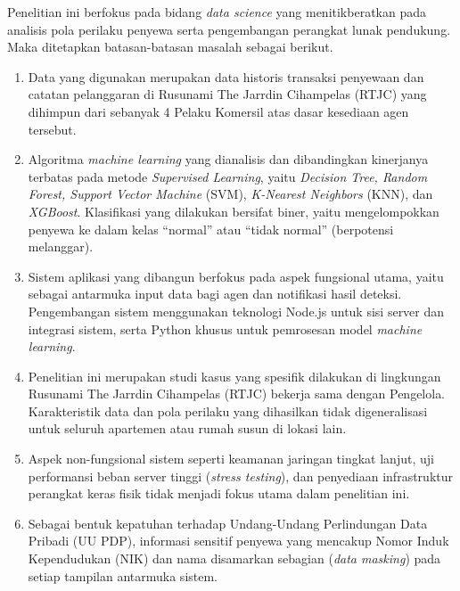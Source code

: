 Penelitian ini berfokus pada bidang \textit{data science} yang menitikberatkan pada analisis pola perilaku penyewa serta pengembangan perangkat lunak pendukung. Maka ditetapkan batasan-batasan masalah sebagai berikut.

\begin{enumerate}
    \item Data yang digunakan merupakan data historis transaksi penyewaan dan catatan pelanggaran di Rusunami The Jarrdin Cihampelas (RTJC) yang dihimpun dari sebanyak 4 Pelaku Komersil atas dasar kesediaan agen tersebut.
    
    \item Algoritma \textit{machine learning} yang dianalisis dan dibandingkan kinerjanya terbatas pada metode \textit{Supervised Learning}, yaitu \textit{Decision Tree, Random Forest, Support Vector Machine} (SVM), \textit{K-Nearest Neighbors} (KNN), dan \textit{XGBoost}. Klasifikasi yang dilakukan bersifat biner, yaitu mengelompokkan penyewa ke dalam kelas ``normal'' atau ``tidak normal'' (berpotensi melanggar).
    
    \item Sistem aplikasi yang dibangun berfokus pada aspek fungsional utama, yaitu sebagai antarmuka input data bagi agen dan notifikasi hasil deteksi. Pengembangan sistem menggunakan teknologi {Node.js} untuk sisi server dan integrasi sistem, serta {Python} khusus untuk pemrosesan model \textit{machine learning}.
    
    \item Penelitian ini merupakan studi kasus yang spesifik dilakukan di lingkungan Rusunami The Jarrdin Cihampelas (RTJC) bekerja sama dengan Pengelola. Karakteristik data dan pola perilaku yang dihasilkan tidak digeneralisasi untuk seluruh apartemen atau rumah susun di lokasi lain.
    
    \item Aspek non-fungsional sistem seperti keamanan jaringan tingkat lanjut, uji performansi beban server tinggi (\textit{stress testing}), dan penyediaan infrastruktur perangkat keras fisik tidak menjadi fokus utama dalam penelitian ini.

    \item Sebagai bentuk kepatuhan terhadap Undang-Undang Perlindungan Data Pribadi (UU PDP), informasi sensitif penyewa yang mencakup Nomor Induk Kependudukan (NIK) dan nama disamarkan sebagian (\textit{data masking}) pada setiap tampilan antarmuka sistem.
\end{enumerate}



